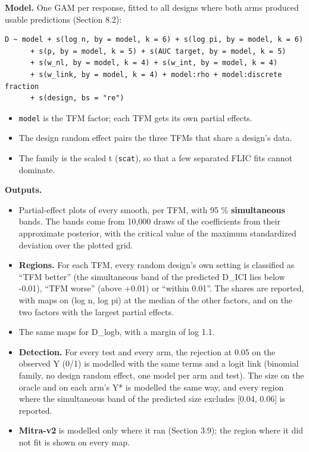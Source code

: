\documentclass[
  10pt,
]{article}
\providecommand{\tightlist}{%
  \setlength{\itemsep}{0pt}\setlength{\parskip}{0pt}}
\begin{document}
\textbf{Model.} One GAM per response, fitted to all designs
where both arms produced usable predictions (Section 8.2):

\begin{verbatim}
D ~ model + s(log n, by = model, k = 6) + s(log pi, by = model, k = 6)
      + s(p, by = model, k = 5) + s(AUC target, by = model, k = 5)
      + s(w_nl, by = model, k = 4) + s(w_int, by = model, k = 4)
      + s(w_link, by = model, k = 4) + model:rho + model:discrete fraction
      + s(design, bs = "re")
\end{verbatim}

\begin{itemize}
\tightlist
\item
  \texttt{model} is the TFM factor; each TFM gets its own
  partial effects.
\item
  The design random effect pairs the three TFMs that share a
  design's data.
\item
  The family is the scaled t (\texttt{scat}), so that a few
  separated FLIC fits cannot dominate.
\end{itemize}

\textbf{Outputs.}

\begin{itemize}
\tightlist
\item
  Partial-effect plots of every smooth, per TFM, with 95 \%
  \textbf{simultaneous} bands. The bands come from 10,000
  draws of the coefficients from their approximate
  posterior, with the critical value of the maximum
  standardized deviation over the plotted grid.
\item
  \textbf{Regions.} For each TFM, every random design's own
  setting is classified as ``TFM better'' (the simultaneous
  band of the predicted D\_ICI lies below -0.01), ``TFM
  worse'' (above +0.01) or ``within 0.01''. The shares are
  reported, with maps on (log n, log pi) at the median of
  the other factors, and on the two factors with the largest
  partial effects.
\item
  The same maps for D\_logb, with a margin of log 1.1.
\item
  \textbf{Detection.} For every test and every arm, the
  rejection at 0.05 on the observed Y (0/1) is modelled with
  the same terms and a logit link (binomial family, no
  design random effect, one model per arm and test). The
  size on the oracle and on each arm's Y* is modelled the
  same way, and every region where the simultaneous band of
  the predicted size excludes {[}0.04, 0.06{]} is reported.
\item
  \textbf{Mitra-v2} is modelled only where it ran (Section
  3.9); the region where it did not fit is shown on every
  map.
\end{itemize}
\end{document}
